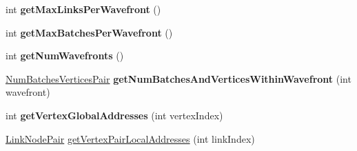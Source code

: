 \begin{DoxyCompactItemize}
\item 
\hypertarget{classbt_soft_body_link_data_d_x11_s_i_m_d_aware_aba00f381da3b24c99d418acf9a76374c}{int {\bfseries get\+Max\+Links\+Per\+Wavefront} ()}\label{classbt_soft_body_link_data_d_x11_s_i_m_d_aware_aba00f381da3b24c99d418acf9a76374c}

\item 
\hypertarget{classbt_soft_body_link_data_d_x11_s_i_m_d_aware_ae4e98917c9f9602c42a6a1b550284a9f}{int {\bfseries get\+Max\+Batches\+Per\+Wavefront} ()}\label{classbt_soft_body_link_data_d_x11_s_i_m_d_aware_ae4e98917c9f9602c42a6a1b550284a9f}

\item 
\hypertarget{classbt_soft_body_link_data_d_x11_s_i_m_d_aware_a235246a60a82333a369be2ddc5eb950e}{int {\bfseries get\+Num\+Wavefronts} ()}\label{classbt_soft_body_link_data_d_x11_s_i_m_d_aware_a235246a60a82333a369be2ddc5eb950e}

\item 
\hypertarget{classbt_soft_body_link_data_d_x11_s_i_m_d_aware_a0f485c42cb17b28a2aff1d4abb0f45c2}{\hyperlink{structbt_soft_body_link_data_d_x11_s_i_m_d_aware_1_1_num_batches_vertices_pair}{Num\+Batches\+Vertices\+Pair} {\bfseries get\+Num\+Batches\+And\+Vertices\+Within\+Wavefront} (int wavefront)}\label{classbt_soft_body_link_data_d_x11_s_i_m_d_aware_a0f485c42cb17b28a2aff1d4abb0f45c2}

\item 
\hypertarget{classbt_soft_body_link_data_d_x11_s_i_m_d_aware_adf129c8a7ed3090c71dd94c31c12a410}{int {\bfseries get\+Vertex\+Global\+Addresses} (int vertex\+Index)}\label{classbt_soft_body_link_data_d_x11_s_i_m_d_aware_adf129c8a7ed3090c71dd94c31c12a410}

\item 
\hyperlink{classbt_soft_body_link_data_1_1_link_node_pair}{Link\+Node\+Pair} \hyperlink{classbt_soft_body_link_data_d_x11_s_i_m_d_aware_ac3eb087312fd7433a9f32f8eee8e40a3}{get\+Vertex\+Pair\+Local\+Addresses} (int link\+Index)
\end{DoxyCompactItemize}

